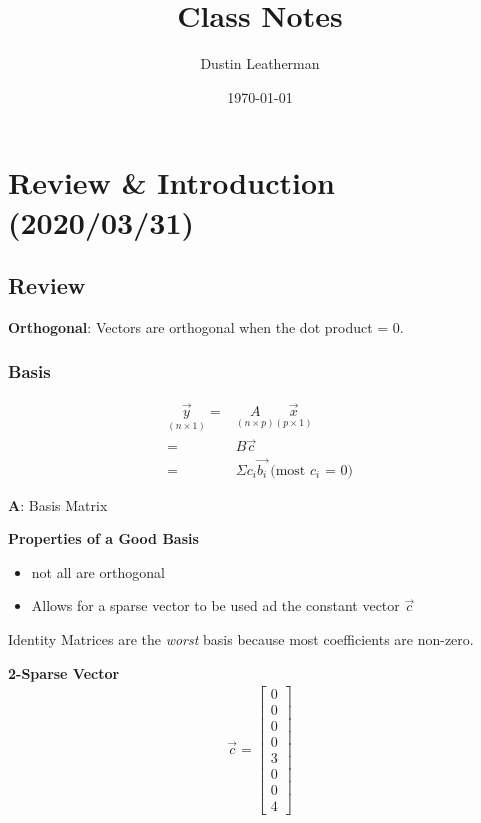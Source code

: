 \documentclass[11pt]{article}
\author{Dustin Leatherman}
\date{\today}
\title{Class Notes}
\begin{document}
\maketitle
\tableofcontents


\section{Review \& Introduction (2020/03/31)}
\label{sec:orgffc0028}
\subsection{Review}
\label{sec:orgf6076de}
\textbf{Orthogonal}: Vectors are orthogonal when the dot product = 0.
\subsubsection{Basis}
\label{sec:org298e664}

\begin{equation}
\begin{split}
\underset{(n \times 1)}{\vec{y}} = & \underset{(n \times p)}{A} \underset{(p \times 1)}{\vec{x}}\\
= & B \vec{c} \\
= & \Sigma c_i \vec{b_i} \ \text{(most $c_i$ = 0)}
\end{split}
\end{equation}

\textbf{A}: Basis Matrix

\textbf{Properties of a Good Basis}
\begin{itemize}
\item not all are orthogonal
\item Allows for a sparse vector to be used ad the constant vector \(\vec{c}\)
\end{itemize}

Identity Matrices are the \emph{worst} basis because most coefficients are non-zero.

\textbf{2-Sparse Vector}
\begin{equation}
\begin{split}
\vec{c} = \begin{bmatrix}
0\\
0\\
0\\
0\\
3\\
0\\
0\\
4
\end{bmatrix}
\end{split}
\end{equation}
\end{document}
